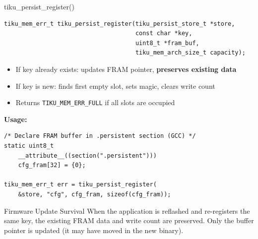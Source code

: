 \documentclass[aspectratio=169, 10pt]{beamer}
\begin{document}
\begin{frame}[fragile]{tiku\_persist\_register()}
\begin{lstlisting}[style=cstyle]
tiku_mem_err_t tiku_persist_register(tiku_persist_store_t *store,
                                     const char *key,
                                     uint8_t *fram_buf,
                                     tiku_mem_arch_size_t capacity);
\end{lstlisting}

\begin{itemize}
  \item If key already exists: updates FRAM pointer, \textbf{preserves existing data}
  \item If key is new: finds first empty slot, sets magic, clears write count
  \item Returns \texttt{TIKU\_MEM\_ERR\_FULL} if all slots are occupied
\end{itemize}

\vspace{0.3em}
\textbf{Usage:}
\begin{lstlisting}[style=cstyle]
/* Declare FRAM buffer in .persistent section (GCC) */
static uint8_t
    __attribute__((section(".persistent")))
    cfg_fram[32] = {0};

tiku_mem_err_t err = tiku_persist_register(
    &store, "cfg", cfg_fram, sizeof(cfg_fram));
\end{lstlisting}

\vspace{0.3em}
\begin{block}{Firmware Update Survival}
When the application is reflashed and re-registers the same key,
the existing FRAM data and write count are preserved. Only the
buffer pointer is updated (it may have moved in the new binary).
\end{block}
\end{frame}
\end{document}

